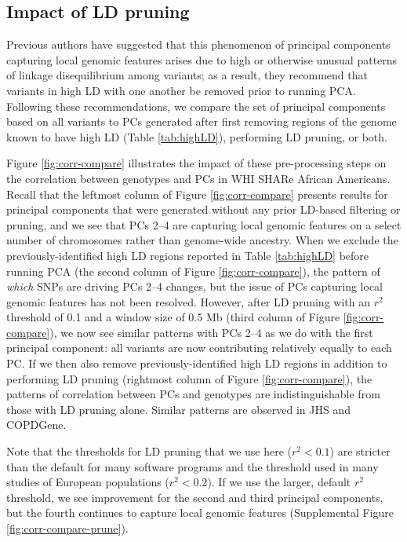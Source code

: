 \documentclass[12pt]{article}
\begin{document}
\subsection{Impact of LD pruning}

Previous authors have suggested that this phenomenon of principal components capturing local genomic features arises due to high or otherwise unusual patterns of linkage disequilibrium among variants; as a result, they recommend that variants in high LD with one another be removed prior to running PCA. 
Following these recommendations, we compare the set of principal components based on all variants to PCs generated after first removing regions of the genome known to have high LD (Table \ref{tab:highLD}), performing LD pruning, or both. 

Figure \ref{fig:corr-compare} illustrates the impact of these pre-processing steps on the correlation between genotypes and PCs in WHI SHARe African Americans. 
Recall that the leftmost column of Figure \ref{fig:corr-compare} presents results for principal components that were generated without any prior LD-based filtering or pruning, and we see that PCs 2--4 are capturing local genomic features on a select number of chromosomes rather than genome-wide ancestry.
When we exclude the previously-identified high LD regions reported in Table \ref{tab:highLD} before running PCA (the second column of Figure \ref{fig:corr-compare}), the pattern of \textit{which} SNPs are driving PCs 2--4 changes, but the issue of PCs capturing local genomic features has not been resolved. 
However, after LD pruning with an $r^2$ threshold of 0.1 and a window size of 0.5 Mb (third column of Figure \ref{fig:corr-compare}), we now see similar patterns with PCs 2--4 as we do with the first principal component: all variants are now contributing relatively equally to each PC. 
If we then also remove previously-identified high LD regions in addition to performing LD pruning (rightmost column of Figure \ref{fig:corr-compare}), the patterns of correlation between PCs and genotypes are indistinguishable from those with LD pruning alone. 
Similar patterns are observed in JHS and COPDGene.

Note that the thresholds for LD pruning that we use here ($r^2 < 0.1$) are stricter than the default for many software programs and the threshold used in many studies of European populations ($r^2 < 0.2$).
If we use the larger, default $r^2$ threshold, we see improvement for the second and third principal components, but the fourth continues to capture local genomic features (Supplemental Figure \ref{fig:corr-compare-prune}). 
\end{document}
